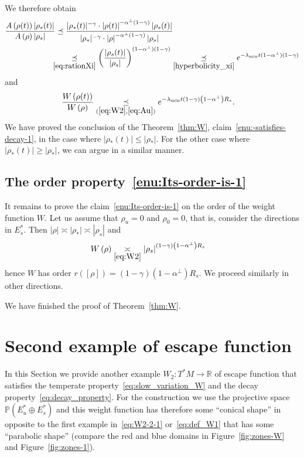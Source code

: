 \documentclass[10pt]{amsart}
\theoremstyle{definition}\newtheorem{defi}[theo]{Definition}\newtheorem{rema}[theo]{Remark}\newtheorem{exam}[theo]{Example}\newtheorem{exem}[theo]{Example}\newtheorem{nota}[theo]{Notation}
\newcommand{\bbR}{\mathbb{R}}
\newcommand{\bbP}{\mathbb{P}}
\begin{document}
We therefore obtain
\begin{align*}
\frac{A\left(\rho(t)\right)\left|\rho{}_{s}(t)\right|}{A\left(\rho\right)\left|\rho{}_{s}\right|}&\preceq\frac{|\rho_{*}(t)|^{-\gamma}\cdot\left|\rho(t)\right|^{-\alpha^{\perp}(1-\gamma)}\left|\rho{}_{s}(t)\right|}{|\rho_{*}|^{-\gamma}\cdot\left|\rho\right|^{-\alpha^{\perp}(1-\gamma)}\left|\rho{}_{s}\right|}\\
&\mkern-10mu\underset{\eqref{eq:rationXi}}{\preceq}\left(\frac{\left|\rho{}_{s}(t)\right|}{\left|\rho{}_{s}\right|}\right)^{(1-\alpha^{\perp})(1-\gamma)}\underset{\eqref{hyperbolicity_xi}}{\preceq}e^{-\lambda_{\min}t(1-\alpha^{\perp})(1-\gamma)}
\end{align*}
and
\begin{align*}
\frac{W\left(\rho(t)\right)}{W\left(\rho\right)} & \underset{(\ref{eq:W2},\ref{eq:Au})}{\preceq}e^{-\lambda_{\min}t\left(1-\gamma\right)\left(1-\alpha^{\perp}\right)R_{s}}.
\end{align*}
We have proved the conclusion of the Theorem~\ref{thm:W}, claim~\ref{enu:-satisfies-decay-1}, in the case where $|\rho_{*}(t)|\le|\rho_{*}|$. For the other case where $|\rho_{*}(t)|\ge|\rho_{*}|$, we can argue in a similar manner.

\subsection{The order property~\eqref{enu:Its-order-is-1}}

It remains to prove the claim~\eqref{enu:Its-order-is-1} on the order of the weight function $W$. Let us assume that $\rho_{u}=0$ and $\rho_{0}=0$, that is, consider the directions in $E_{s}^{*}$. Then $|\rho|\asymp|\rho_{*}|\asymp|\rho_{s}|$ and
\begin{align*}
W\left(\rho\right) & \underset{\eqref{eq:W2}}{\asymp}\left|\rho_{s}\right|^{\left(1-\gamma\right)\left(1-\alpha^{\perp}\right)R_{s}}
\end{align*}
hence $W$ has order $r([\rho])=(1-\gamma)(1-\alpha^{\perp})R_{s}$. We proceed similarly in other directions.

We have finished the proof of Theorem~\ref{thm:W}.

\section{\label{sec:Second-example-of}
Second example of escape function}

In this Section we provide another example $W_{2}:T^{*}M\to\bbR$ of escape function that satisfies the temperate property~\eqref{eq:slow_variation_W} and the decay property~\eqref{eq:decay_property}. For the construction we use the projective space $\bbP(E_{u}^{*}\oplus E_{s}^{*})$ and this weight function has therefore some ``conical shape'' in opposite to the first example in~\eqref{eq:W2-2-1} or~\eqref{eq:def_W1} that has some ``parabolic shape'' (compare the red and blue domains in Figure~\ref{fig:zones-W} and Figure~\ref{fig:zones-1}).
\end{document}
